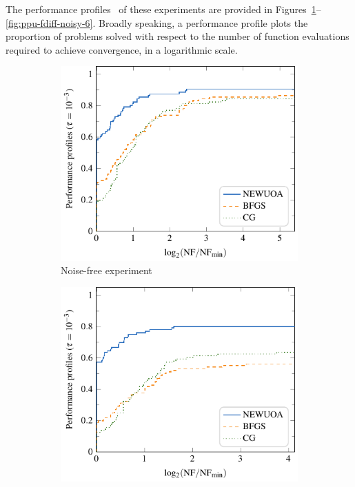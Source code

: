 \documentclass[
    smallextended,  %
    final,        %
]{svjour3}
\begin{document}
The performance profiles~\cite{Dolan_More_2002,More_Wild_2009} of these experiments are provided in
Figures~\mbox{\ref{fig:ppu-fdiff-plain}--\ref{fig:ppu-fdiff-noisy-6}}.
Broadly speaking, a performance profile plots the proportion of problems solved with respect to the number of function evaluations required to achieve convergence, in a logarithmic scale.

\begin{figure}[ht]
    \begin{subfigure}{.48\textwidth}
        \centering
        \includegraphics[width=\textwidth]{perf-plain-bfgs_cg_pdfo-50.pdf}
        \caption{Noise-free experiment}
        \label{fig:ppu-fdiff-plain}
    \end{subfigure}
    \hfill
    \begin{subfigure}{.48\textwidth}
        \centering
        \includegraphics[width=\textwidth]{perf-noisy-bfgs_cg_pdfo-50-10.pdf}

\end{subfigure}
\end{figure}
\end{document}
